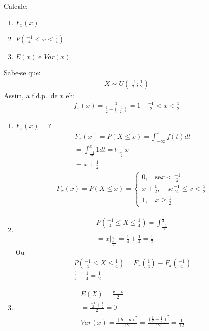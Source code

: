 \documentclass[11pt,a4paper]{book}
\begin{document}
\begin{description}
     Calcule:
\begin{enumerate}[label=(\alph*)]
  \item $F_{x} (x)$
  \item $P(\frac{-1}{4} \leq x \leq \frac{1}{4})$
  \item $E(x)$ e $Var(x)$
\end{enumerate}
Sabe-se que:
\begin{align*}
  X \mathtt{\sim}  U(\frac{-1}{2}; \frac{1}{2})
\end{align*}
Assim, a f.d.p.\ de $x$ eh:
\begin{align*}
  f_{x} (x)= \frac{1}{\frac{1}{2}- \left( \frac{-1}{2}\right)} = 1 \quad \frac{-1}{2}<x<\frac{1}{2}
\end{align*}
\begin{enumerate}[label=(\alph*)]
  \item  $F_{x}(x)=?$
    \begin{align*}
      F_{x} (x)= P(X \leq x) = \int_{ -\infty  }^{x} f(t)dt\\
      = \int_{\frac{-1}{2}}^{x} 1 dt= t|_{\frac{-1}{2}}{x} \\
      = x+ \frac{1}{2}
    \end{align*}
    \begin{align*}
      F_{x} (x) = P(X \leq x) = \begin{cases}
        0, \quad \text{se}  x< \frac{-1}{2} \\
        x+ \frac{1}{2} , \quad \text{se} \frac{-1}{2} \leq x < \frac{1}{2} \\
        1, \quad x \ge \frac{1}{2}
      \end{cases}
    \end{align*}
    \item 
      \begin{align*}
      P(\frac{-1}{4}\leq X \leq \frac{1}{4})  = \int_{\frac{-1}{4}}^{\frac{1}{4}}\\
      = x|_{\frac{-1}{4}}^{\frac{1}{4}}= \frac{1}{4}+\frac{1}{4}=\frac{1}{2}
    \end{align*}
    Ou 
    \begin{align*}
      P(\frac{-1}{4} \leq X \leq \frac{1}{4})= F_{x}(\frac{1}{4})-F_{x}(\frac{-1}{4}) \\
      \frac{3}{4}- \frac{1}{4}= \frac{1}{2}
    \end{align*}
    \item 
      \begin{align*}
        E(X) = \frac{a+b}{2} \\
        = \frac{\frac{-1}{2} + \frac{1}{2}}{2}=0\\
        Var(x)= \frac{ \left( b-a \right)^2 }{12}= \frac{ \left( \frac{1}{2} + \frac{1}{2} \right)^2 }{12}= \frac{1}{12}
      \end{align*}
\end{enumerate}

   \end{description}
\end{document}
